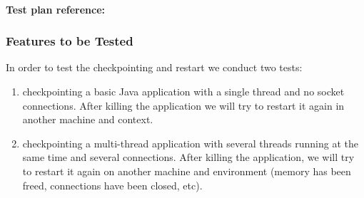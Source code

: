 

\\
\noindent\textbf{Test plan reference: } %



\subsubsection{Features to be Tested}
In order to test the checkpointing and restart we conduct two tests:
\begin{enumerate}
	\item checkpointing a basic Java application with a single thread and no socket connections. 
After killing the application we will try to restart it again in another machine and context.
	\item checkpointing a multi-thread application with several threads running at the same time
and several connections. After killing the application, we will try to restart it again on another
machine and environment (memory has been freed, connections have been closed, etc). 
\end{enumerate}


